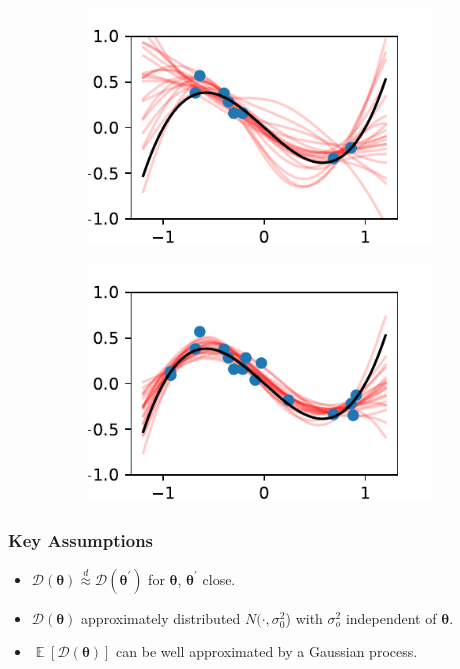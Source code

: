 \documentclass{beamer}
\DeclareMathOperator{\E}{\mathbb{E}}
\begin{document}
\begin{frame}
\begin{figure}
\begin{subfigure}[t]{0.4\textwidth}
            \includegraphics[width=\textwidth]{cub_GP_err_8_iters.pdf}
        \end{subfigure}%
        \begin{subfigure}[t]{0.4\textwidth}
            \centering
            \includegraphics[width=\textwidth]{cub_GP_err_16_iters.pdf}
        \end{subfigure}%
    \end{figure}
\end{frame}

\begin{frame}
    \frametitle{Key Assumptions}
    \begin{itemize}
        \item $\mathcal{D}(\bm{\theta})
                  \overset{d}{\approx} \mathcal{D}(\bm{\theta}^\prime)$ for
              $\bm{\theta}$, $\bm{\theta}^\prime$ close.
        \item $\mathcal{D}(\bm{\theta})$ approximately distributed
              $N(\cdot, \sigma^2_0$) with $\sigma^2_o$ independent of
              $\bm{\theta}.$
        \item $\E[\mathcal{D}(\bm{\theta})]$ can be well approximated by a
              Gaussian process.
    \end{itemize}
\end{frame}
\end{document}
